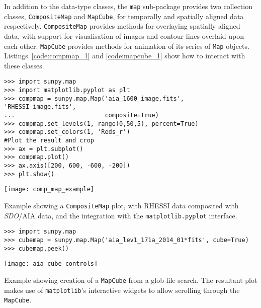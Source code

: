 In addition to the data-type classes, the \texttt{map} sub-package provides two 
collection classes, \texttt{CompositeMap} and \texttt{MapCube}, for 
temporally and spatially aligned data respectively.
\texttt{CompositeMap} provides methods for overlaying spatially aligned 
data, with support for visualisation of images and contour lines overlaid 
upon each other.
\texttt{MapCube} provides methods for animation of its series of \texttt{Map} 
objects. Listings~\ref{code:compmap_1} and \ref{code:mapcube_1} show how to 
interact with these classes.

\begin{listing}[H]
\begin{verbatim}
>>> import sunpy.map
>>> import matplotlib.pyplot as plt
>>> compmap = sunpy.map.Map('aia_1600_image.fits', 'RHESSI_image.fits', 
...                         composite=True)
>>> compmap.set_levels(1, range(0,50,5), percent=True)
>>> compmap.set_colors(1, 'Reds_r')
#Plot the result and crop
>>> ax = plt.subplot()
>>> compmap.plot()
>>> ax.axis([200, 600, -600, -200])
>>> plt.show()
\end{verbatim}
\begin{center}
\texttt{[image: comp\_map\_example]}
\end{center}
\caption{Example showing a \texttt{CompositeMap} plot, with RHESSI data composited
with \textit{SDO}/AIA data, and the integration with the \texttt{matplotlib.pyplot} interface.}
\label{code:compmap_1}
\end{listing}

\begin{listing}[H]
\begin{verbatim}
>>> import sunpy.map
>>> cubemap = sunpy.map.Map('aia_lev1_171a_2014_01*fits', cube=True)
>>> cubemap.peek()
\end{verbatim}
\begin{center}
\texttt{[image: aia\_cube\_controls]}
\end{center}
\caption{Example showing creation of a \texttt{MapCube} from a glob file search. The 
resultant plot makes use of \texttt{matplotlib}'s interactive widgets to allow scrolling 
through the \texttt{MapCube}.}
\label{code:mapcube_1}
\end{listing}